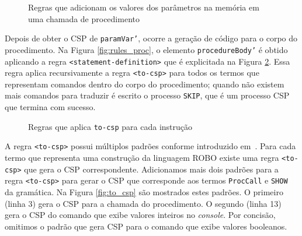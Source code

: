 \begin{figure}[!h]
\centering
\caption{Regras que adicionam os valores dos parâmetros na memória em uma chamada de procedimento}

\label{fig:put_proc}
\end{figure}

Depois de obter o CSP de \texttt{paramVar'}, ocorre a geração de código para o corpo do procedimento.
Na Figura \ref{fig:rules_proc}, o elemento \texttt{procedureBody'} é obtido aplicando a regra \texttt{<statement-definition>} que é explicitada na Figura \ref{fig:statement}. Essa regra aplica recursivamente a regra \texttt{<to-csp>} para todos os termos que representam comandos dentro do corpo do procedimento; quando não existem mais comandos para traduzir é escrito o processo \texttt{SKIP}, que é um processo CSP que termina com sucesso.

\begin{figure}[!h]
\centering
\caption{Regras que aplica \texttt{to-csp} para cada instrução}

\label{fig:statement}
\end{figure}

A regra \texttt{<to-csp>} possui múltiplos padrões conforme introduzido em~\cite{nogueira}. Para cada termo que representa uma construção da linguagem ROBO existe uma regra \texttt{<to-csp>} que gera o CSP correspondente.
Adicionamos mais dois padrões para a regra \texttt{<to-csp>} para gerar o CSP que corresponde aos termos \texttt{ProcCall} e \texttt{SHOW} da gramática. Na Figura \ref{fig:to_csp} são mostrados estes padrões. O primeiro (linha 3) gera o CSP para a chamada do procedimento. O segundo (linha 13) gera o CSP do comando que exibe valores inteiros no \textit{console}.
Por concisão, omitimos o padrão que gera CSP para o comando que exibe valores booleanos. 

